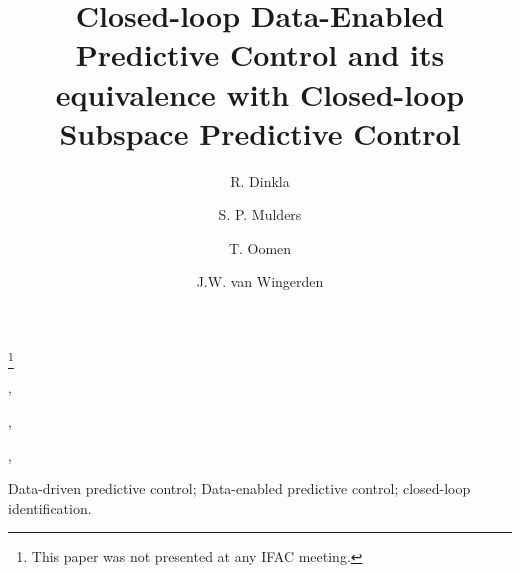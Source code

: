 \documentclass[twocolumn]{autart}    %
\begin{document}
\begin{frontmatter}

\title{Closed-loop Data-Enabled Predictive Control and its equivalence with Closed-loop Subspace Predictive Control} %

\thanks[footnoteinfo]{This paper was not presented at any IFAC meeting.}

\author[TUD]{R. Dinkla},    %
\author[TUD]{S. P. Mulders},               %
\author[TUD,TUE]{T. Oomen},  %
\author[TUD]{J.W. van Wingerden}
\address[TUD]{Delft Center for Systems and Control, Delft University of Technology, Mekelweg 2, 2628CD Delft, The Netherlands}  %
\address[TUE]{Control Systems Technology Group, Eindhoven University of Technology, 5600
MB Eindhoven, The Netherlands}        %

          
\begin{keyword}                           %
Data-driven predictive control; Data-enabled predictive control; closed-loop identification.               %
\end{keyword}                             %



\end{frontmatter}
\end{document}

